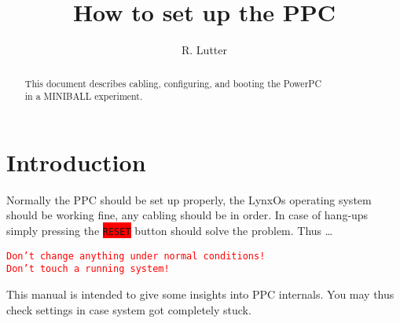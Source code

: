 \documentclass[10pt]{article}
\newcommand{\red}[1]{\colorbox{red}{\texttt{#1}}}
\newcommand{\redt}[1]{\textcolor{red}{\texttt{#1}}}
\begin{document}
\begin{titlepage}
\title{How to set up the PPC}
\author{R. Lutter}
\maketitle
\vfill
\begin{abstract}
\setlength{\parindent}{0pt}
\begin{center}
This document describes cabling, configuring, and booting the PowerPC\\
in a \mbox{MINIBALL} experiment.
\end{center}
\end{abstract}
\vfill
\end{titlepage}
\newpage
\tableofcontents
\newpage
\section{Introduction}\label{Introduction}
Normally the PPC should be set up properly, the LynxOs operating system should be working fine, any cabling should be in order. In case of hang-ups simply pressing the \red{RESET} button should solve the problem. Thus \dots
\begin{center}
\redt{Don't change anything under normal conditions!\\
Don't touch a running system!}
 \end{center}

This manual is intended to give some insights into PPC internals. You may thus check settings in case system got completely stuck.
\end{document}
